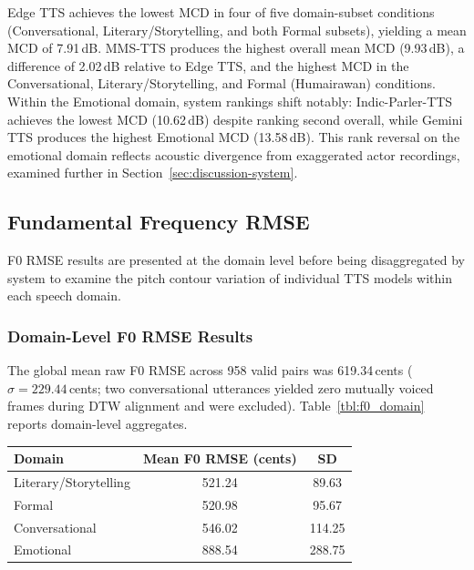 \documentclass[a4paper,fleqn]{cas-dc}
\begin{document}
    
    Edge TTS achieves the lowest MCD in four of five domain-subset conditions
    (Conversational, Literary/Storytelling, and both Formal subsets),
    yielding a mean MCD of 7.91\,dB. MMS-TTS produces the highest overall mean MCD
    (9.93\,dB), a difference of 2.02\,dB relative to Edge TTS, and the highest
    MCD in the Conversational, Literary/Storytelling, and Formal (Humairawan)
    conditions. Within the Emotional domain, system rankings shift notably:
    Indic-Parler-TTS achieves the lowest MCD (10.62\,dB) despite ranking
    second overall, while Gemini TTS produces the highest Emotional MCD (13.58\,dB). This rank
    reversal on the emotional domain reflects acoustic divergence from exaggerated actor recordings,
    examined further in Section~\ref{sec:discussion-system}.
    
    \subsection{Fundamental Frequency RMSE}\label{sec:results-f0}

    \hspace*{1.2em} F0 RMSE results are presented at the domain level before being disaggregated by system to examine the pitch contour variation of individual TTS models within each speech domain.

    \subsubsection{Domain-Level F0 RMSE Results}
    
    \hspace*{1.2em} The global mean raw F0 RMSE across 958 valid pairs was 619.34\,cents
    ($\sigma = 229.44$\,cents; two conversational utterances yielded zero mutually voiced frames during DTW alignment and were excluded).
    Table~\ref{tbl:f0_domain} reports domain-level aggregates.
    
    \begin{center}
    \label{tbl:f0_domain}
    
    \small
    \setlength{\tabcolsep}{7pt}
    \renewcommand{\arraystretch}{1.2}
    
    \begin{tabular*}{\columnwidth}{@{\extracolsep{\fill}}lcc@{}}
    \toprule
    \textbf{Domain} & \textbf{Mean F0 RMSE (cents)} & \textbf{SD} \\
    \midrule
    Literary/Storytelling & 521.24 & 89.63  \\
    Formal                & 520.98 & 95.67  \\
    Conversational        & 546.02 & 114.25 \\
    Emotional             & 888.54 & 288.75 \\
    \bottomrule
    \end{tabular*}
    \end{center}
    
\end{document}

